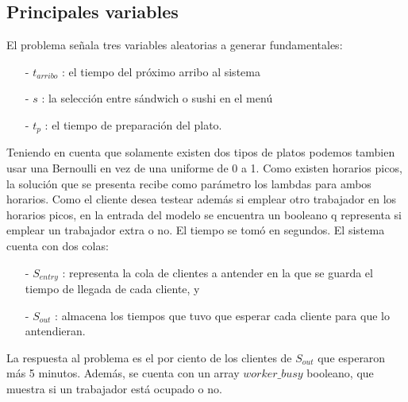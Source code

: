 \documentclass[11pt]{article}
\begin{document}
\subsection{Principales variables}
El problema se\~nala tres variables aleatorias a generar fundamentales:
\begin{enumerate}
	\item[-] $t_{arribo}$ : el tiempo del pr\'oximo arribo al sistema 
	\item[-] $s$ : la selecci\'on entre s\'andwich o sushi en el men\'u
	\item[-] $t_{p}$ : el tiempo de preparaci\'on del plato.
\end{enumerate} 
Teniendo en cuenta que solamente existen dos tipos de platos podemos tambien usar una Bernoulli en vez de una uniforme de 0 a 1. Como existen horarios picos, la soluci\'on que se presenta recibe como par\'ametro los lambdas para ambos horarios. Como el cliente desea testear adem\'as si emplear otro trabajador en los horarios picos, en la entrada del modelo se encuentra un booleano q representa si emplear un trabajador extra o no.
El tiempo se tom\'o en segundos.
El sistema cuenta con dos colas:
\begin{enumerate}
	\item[-] $S_{entry}$ : representa la cola de clientes a antender en la que se guarda el tiempo de llegada de cada cliente, y 
	\item[-] $S_{out}$ : almacena los tiempos que tuvo que esperar cada cliente para que lo antendieran.
\end{enumerate}
La respuesta al problema es el por ciento de los clientes de $S_{out}$ que esperaron m\'as 5 minutos.
Adem\'as, se cuenta con un array $worker\_busy$ booleano, que muestra si un trabajador est\'a ocupado o no.
\end{document}
